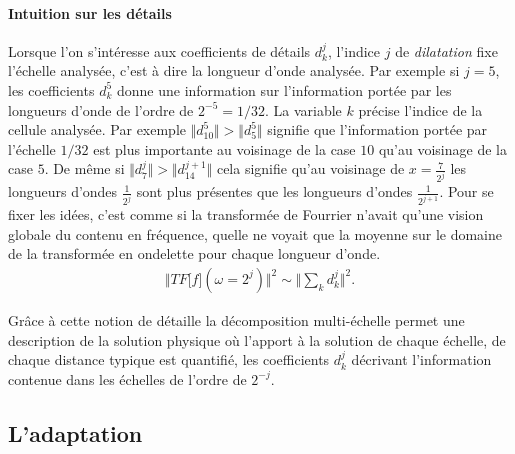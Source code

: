         \paragraph{Intuition sur les détails}
            Lorsque l'on s'intéresse aux coefficients de détails $d_k^j$,
            l'indice $j$ de \textit{dilatation} fixe l'échelle analysée, c'est à dire la longueur d'onde analysée. Par exemple si $j=5$, 
            les coefficients $d^5_k$ donne une information sur l'information portée par les longueurs d'onde de l'ordre de $2^{-5} = 1/32$.
            La variable $k$ précise l'indice de la cellule analysée.
            Par exemple $\Vert d^5_10 \Vert > \Vert d^5_5 \Vert$ signifie que l'information portée par l'échelle $1/32$
            est plus importante au voisinage de la case $10$ qu'au voisinage de la case $5$.
            De même si $\Vert d^j_7 \Vert > \Vert d^{j+1}_{14} \Vert$ cela signifie qu'au voisinage de $x=\frac{7}{2^j}$
            les longueurs d'ondes $\frac{1}{2^j}$ sont plus présentes que les longueurs d'ondes $\frac{1}{2^{j+1}}.$
            Pour se fixer les idées, c'est comme si la transformée de Fourrier n'avait qu'une vision globale du contenu en fréquence, 
            quelle ne voyait que la moyenne sur le domaine de la transformée en ondelette pour chaque longueur d'onde.
            \begin{align}
                \Vert TF\bigl[ f \bigr](\omega = 2^j) \Vert^2 \sim \Vert \sum_{k} d^j_k \Vert^2.
            \end{align}
            \par 
            Grâce à cette notion de détaille la décomposition multi-échelle permet une description de la solution physique où l'apport à la solution de chaque échelle,
            de chaque distance typique est quantifié, les coefficients $d_k^j$ décrivant l'information contenue dans les échelles de l'ordre de $2^{-j}$.
\subsection{L'adaptation}\label{par:adaptation}

